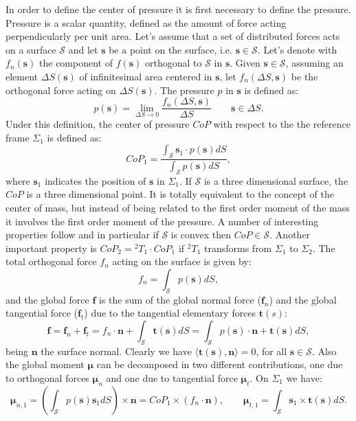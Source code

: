 \documentclass[12pt,a4paper,twoside]{article}
\begin{document}
In order to define the center of pressure it is first necessary to define the pressure. Pressure is a scalar quantity, defined as the amount of force acting perpendicularly per unit area. Let's assume that a set of distributed forces acts on a surface $\mathcal S$ and let $\bm s$ be a point on the surface, i.e. $\mathbf s \in \mathcal S$. Let's denote with $f_n(\mathbf s)$ the component of $f(\mathbf s)$ orthogonal to $\mathcal S$ in $\mathbf s$. Given $\mathbf s \in \mathcal S$, assuming an element $\Delta S(\mathbf s)$ of infinitesimal area centered in $\mathbf s$, let $f_n(\Delta S,\mathbf s)$ be the orthogonal force acting on $\Delta S(\mathbf s)$. The pressure $p$ in $\mathbf s$ is defined as:
$$
p(\mathbf s) = \lim_{\Delta S \rightarrow 0} \frac{f_n(\Delta S, \mathbf s)}{\Delta S} \qquad \mathbf s \in \Delta S.
$$
Under this definition, the center of pressure $CoP$ with respect to the the reference frame $\Sigma_1$ is defined as:
$$
CoP_1 = \frac{\int_{\mathcal S} \mathbf s_1 \cdot p(\mathbf s) dS}{\int_{\mathcal S} p(\mathbf s) dS},
$$
where $\mathbf s_1$ indicates the position of $\mathbf s$ in $\Sigma_1$. If $\mathcal S$ is a three dimensional surface, the $CoP$ is a three dimensional point. It is totally equivalent to the concept of the center of mass, but instead of being related to the first order moment of the mass it involves the first order moment of the pressure. A number of interesting properties follow and in particular if $\mathcal S$ is convex then $CoP \in \mathcal S$. Another important property is $CoP_2 ={}^2 T_1 \cdot CoP_1$ if $^2 T_1$ transforms from $\Sigma_1$ to $\Sigma_2$. The total orthogonal force $f_n$ acting on the surface is given by:
$$
f_n = \int_{\mathcal S} p(\mathbf s) dS,
$$
and the global force $\mathbf f$ is the sum of the global normal force ($\mathbf f_n$) and the global tangential force ($\mathbf f_t$) due to the tangential elementary forces $\mathbf t(s)$:
$$
\mathbf f = \mathbf f_n +\mathbf f_t = f_n \cdot \mathbf n + \int_{\mathcal S} \mathbf t(\mathbf s) dS = \int_{\mathcal S} p(\mathbf s) \cdot \mathbf n + \mathbf t(\mathbf s) dS,
$$
being $\mathbf n$ the surface normal. Clearly we have $\langle \mathbf t(\mathbf s), \mathbf n \rangle=0$, for all $\mathbf s \in \mathcal S$. Also the global moment $\boldsymbol\mu$ can be decomposed in two different contributions, one due to orthogonal forces $\boldsymbol\mu_n$ and one due to tangential force $\boldsymbol\mu_t$. On $\Sigma_1$ we have:
$$ 
\boldsymbol\mu_{n,1} = \left( \int_{\mathcal S} p(\mathbf s) \mathbf s_1 dS \right) \times \mathbf n = CoP_1 \times \left( f_n \cdot \mathbf n \right), \qquad \boldsymbol\mu_{t,1} = \int_{\mathcal S}  \mathbf s_1 \times \mathbf t(\mathbf s) dS. 
$$
\end{document}
